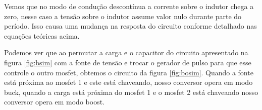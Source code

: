 \documentclass{article}
\begin{document}
Vemos que no modo de condução descontínua a corrente sobre o indutor chega a zero, nesse caso a tensão sobre o indutor assume valor nulo durante parte do período. Isso causa uma mudança na resposta do circuito conforme detalhado nas equações teóricas acima.

Podemos ver que ao permutar a carga e o capacitor do circuito apresentado na figura \ref{fig:bsim} com a fonte de tensão e trocar o gerador de pulso para que esse controle o outro mosfet, obtemos o circuito da figura \ref{fig:bosim}. Quando a fonte está próxima ao mosfet 1 e este está chaveando, nosso conversor opera em modo buck, quando a carga está próxima do mosfet 1 e o mosfet 2 está chaveando nosso conversor opera em modo boost.

\end{document}
